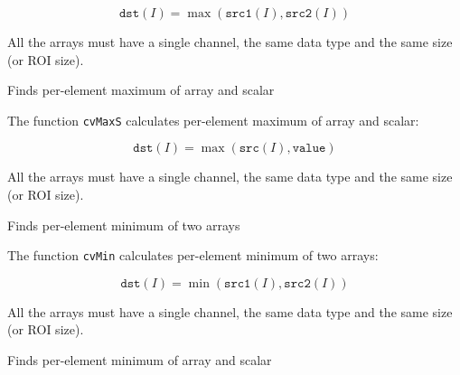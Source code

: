 \[
\texttt{dst}(I)=\max(\texttt{src1}(I), \texttt{src2}(I))
\]

All the arrays must have a single channel, the same data type and the same size (or ROI size).



Finds per-element maximum of array and scalar


\begin{description}
\end{description}

The function \texttt{cvMaxS} calculates per-element maximum of array and scalar:

\[
\texttt{dst}(I)=\max(\texttt{src}(I), \texttt{value})
\]

All the arrays must have a single channel, the same data type and the same size (or ROI size).



Finds per-element minimum of two arrays


\begin{description}
\end{description}


The function \texttt{cvMin} calculates per-element minimum of two arrays:

\[
\texttt{dst}(I)=\min(\texttt{src1}(I),\texttt{src2}(I))
\]

All the arrays must have a single channel, the same data type and the same size (or ROI size).



Finds per-element minimum of array and scalar


\begin{description}
\end{description}

